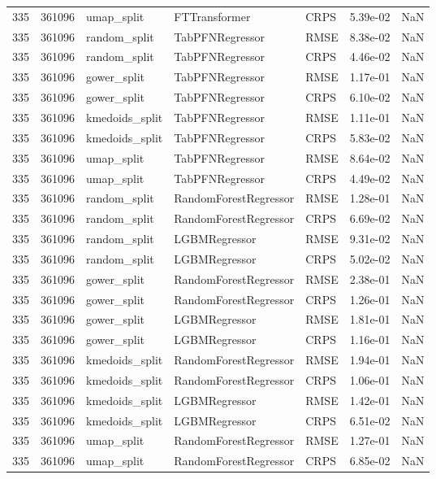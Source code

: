 \begin{tabular}{rrlllrr}
335 & 361096 & umap\_split & FTTransformer & CRPS & 5.39e-02 & NaN \\
335 & 361096 & random\_split & TabPFNRegressor & RMSE & 8.38e-02 & NaN \\
335 & 361096 & random\_split & TabPFNRegressor & CRPS & 4.46e-02 & NaN \\
335 & 361096 & gower\_split & TabPFNRegressor & RMSE & 1.17e-01 & NaN \\
335 & 361096 & gower\_split & TabPFNRegressor & CRPS & 6.10e-02 & NaN \\
335 & 361096 & kmedoids\_split & TabPFNRegressor & RMSE & 1.11e-01 & NaN \\
335 & 361096 & kmedoids\_split & TabPFNRegressor & CRPS & 5.83e-02 & NaN \\
335 & 361096 & umap\_split & TabPFNRegressor & RMSE & 8.64e-02 & NaN \\
335 & 361096 & umap\_split & TabPFNRegressor & CRPS & 4.49e-02 & NaN \\
335 & 361096 & random\_split & RandomForestRegressor & RMSE & 1.28e-01 & NaN \\
335 & 361096 & random\_split & RandomForestRegressor & CRPS & 6.69e-02 & NaN \\
335 & 361096 & random\_split & LGBMRegressor & RMSE & 9.31e-02 & NaN \\
335 & 361096 & random\_split & LGBMRegressor & CRPS & 5.02e-02 & NaN \\
335 & 361096 & gower\_split & RandomForestRegressor & RMSE & 2.38e-01 & NaN \\
335 & 361096 & gower\_split & RandomForestRegressor & CRPS & 1.26e-01 & NaN \\
335 & 361096 & gower\_split & LGBMRegressor & RMSE & 1.81e-01 & NaN \\
335 & 361096 & gower\_split & LGBMRegressor & CRPS & 1.16e-01 & NaN \\
335 & 361096 & kmedoids\_split & RandomForestRegressor & RMSE & 1.94e-01 & NaN \\
335 & 361096 & kmedoids\_split & RandomForestRegressor & CRPS & 1.06e-01 & NaN \\
335 & 361096 & kmedoids\_split & LGBMRegressor & RMSE & 1.42e-01 & NaN \\
335 & 361096 & kmedoids\_split & LGBMRegressor & CRPS & 6.51e-02 & NaN \\
335 & 361096 & umap\_split & RandomForestRegressor & RMSE & 1.27e-01 & NaN \\
335 & 361096 & umap\_split & RandomForestRegressor & CRPS & 6.85e-02 & NaN \\

\end{tabular}
